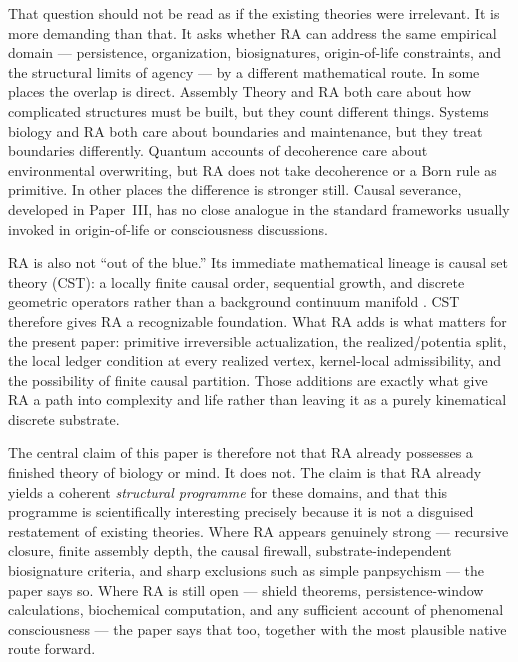 \documentclass[11pt]{article}
\begin{document}
That question should not be read as if the existing theories were irrelevant. It is more demanding than that. It asks whether RA can address the same empirical domain --- persistence, organization, biosignatures, origin-of-life constraints, and the structural limits of agency --- by a different mathematical route. In some places the overlap is direct. Assembly Theory and RA both care about how complicated structures must be built, but they count different things. Systems biology and RA both care about boundaries and maintenance, but they treat boundaries differently. Quantum accounts of decoherence care about environmental overwriting, but RA does not take decoherence or a Born rule as primitive. In other places the difference is stronger still. Causal severance, developed in Paper~III, has no close analogue in the standard frameworks usually invoked in origin-of-life or consciousness discussions.

RA is also not ``out of the blue.'' Its immediate mathematical lineage is causal set theory (CST): a locally finite causal order, sequential growth, and discrete geometric operators rather than a background continuum manifold \cite{Bombelli1987,Sorkin1997,Rideout2000,Benincasa2010,Dowker2013}. CST therefore gives RA a recognizable foundation. What RA adds is what matters for the present paper: primitive irreversible actualization, the realized/potentia split, the local ledger condition at every realized vertex, kernel-local admissibility, and the possibility of finite causal partition. Those additions are exactly what give RA a path into complexity and life rather than leaving it as a purely kinematical discrete substrate.

The central claim of this paper is therefore not that RA already possesses a finished theory of biology or mind. It does not. The claim is that RA already yields a coherent \emph{structural programme} for these domains, and that this programme is scientifically interesting precisely because it is not a disguised restatement of existing theories. Where RA appears genuinely strong --- recursive closure, finite assembly depth, the causal firewall, substrate-independent biosignature criteria, and sharp exclusions such as simple panpsychism --- the paper says so. Where RA is still open --- shield theorems, persistence-window calculations, biochemical computation, and any sufficient account of phenomenal consciousness --- the paper says that too, together with the most plausible native route forward.

\end{document}
